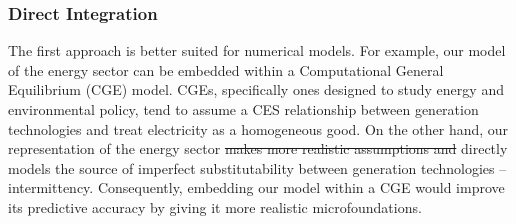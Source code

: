 \documentclass[11pt,a4paper,leqno]{extarticle}
\providecommand{\DIFdel}[1]{{\protect\color{red}\sout{#1}}}                      %
\providecommand{\DIFdelbegin}{} %
\providecommand{\DIFdelend}{} %
\begin{document}
	\subsubsection{Direct Integration}
	
	The first approach is better suited for numerical models. For example, our model of the energy sector can be embedded within a Computational General Equilibrium (CGE) model. CGEs, specifically ones designed to study energy and environmental policy, tend to assume a CES relationship between generation technologies and treat electricity as a homogeneous good. On the other hand, our representation of the energy sector \DIFdelbegin \DIFdel{makes more realistic assumptions and }\DIFdelend directly models the source of imperfect substitutability between generation technologies -- intermittency. Consequently, embedding our model within a CGE would improve its predictive accuracy by giving it more realistic microfoundations. 
	
\end{document}
